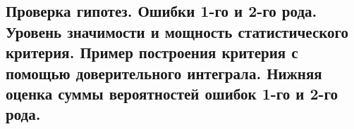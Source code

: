 \subsection{Проверка гипотез. Ошибки 1-го и 2-го рода. Уровень значимости и мощность статистического критерия. Пример построения критерия с помощью доверительного интеграла. Нижняя оценка суммы вероятностей ошибок 1-го и 2-го рода.}